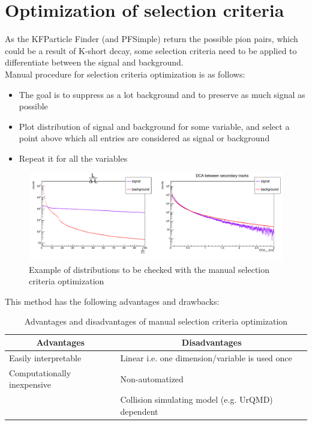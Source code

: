 \documentclass[12pt,a4paper]{report}
\begin{document}
\section{Optimization of selection criteria}
As the KFParticle Finder (and PFSimple) return the possible pion pairs, which could be a result of K-short decay,  some selection criteria need to be applied to differentiate between the signal and background.\\ Manual procedure for selection criteria optimization \cite{manual} is as follows:
\begin{itemize}
    \item The goal is to suppress as a lot background and to preserve as much signal as possible 
    \item Plot distribution of signal and background for some variable, and select a point above which all entries are considered as signal or background
    \item Repeat it for all the variables
\end{itemize}
\begin{figure}[H]
    \centering
    \includegraphics[width=1\textwidth]{images/pfsimple_distributions.pdf}
    \caption{Example of distributions to be checked with the manual selection criteria optimization}
\end{figure}

This method has the following advantages and drawbacks:
\begin{table}[h!]
    \begin{tabular}{l|l|}
    \hline
    \multicolumn{1}{|c|}{\textbf{Advantages}}  & \multicolumn{1}{c|}{\textbf{Disadvantages}}     \\ \hline
    \multicolumn{1}{|l|}{Easily interpretable} & Linear i.e. one dimension/variable is used once \\ \hline
    \multicolumn{1}{|l|}{Computationally inexpensive} & Non-automatized                                   \\ \hline
                                                      & Collision simulating model (e.g. UrQMD) dependent \\ \cline{2-2} 
    \end{tabular}
\caption{\label{tab:manualselection}Advantages and disadvantages of manual selection criteria optimization}
\end{table}
\end{document}
